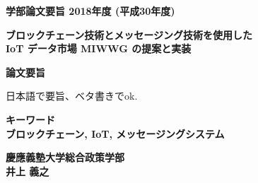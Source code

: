 \begin{center}
\textbf{\Large 学部論文要旨 2018年度 (平成30年度)}

\vspace{6.18mm}

\textbf{\large ブロックチェーン技術とメッセージング技術を使用した \\ IoT データ市場 MIWWG の提案と実装} 

\end{center}

\vspace{10mm}

\begin{flushleft}
\textbf{論文要旨}\\
\end{flushleft}
日本語で要旨、ベタ書きでok.


\begin{flushleft}
\textbf{キーワード}\\
\textbf{ブロックチェーン, IoT, メッセージングシステム}

\end{flushleft}

\begin{flushright}
\textbf{慶應義塾大学総合政策学部}\\
\textbf{井上 義之}
\end{flushright}
\newpage

